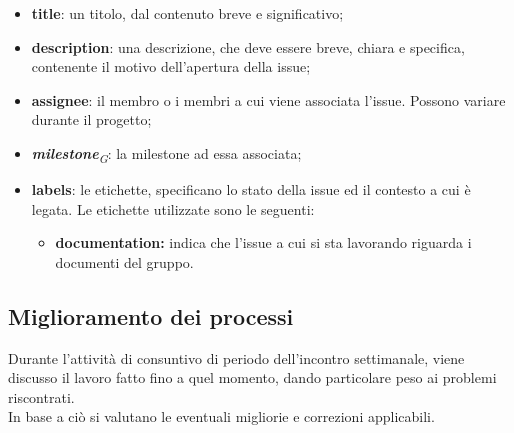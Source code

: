 \documentclass[a4paper, 12pt]{article}
\begin{document}
\begin{itemize}
    \item \textbf{title}: un titolo, dal contenuto breve e significativo;
    \item \textbf{description}: una descrizione, che deve essere breve, chiara e specifica, contenente il
    motivo dell'apertura della issue;
    \item \textbf{assignee}: il membro o i membri a cui viene associata l'issue.
    Possono variare durante il progetto;
    \item \textbf{\textit{milestone}}\textit{\textsubscript{G}}: la milestone ad
    essa associata;
    \item \textbf{labels}: le etichette, specificano lo stato della issue ed il
    contesto a cui è legata. Le etichette utilizzate sono le seguenti:
    \begin{itemize}
        \item \textbf{documentation:} indica che l'issue a cui si sta lavorando
        riguarda i documenti del gruppo.
    \end{itemize}
\end{itemize}


\subsection{Miglioramento dei processi}
Durante l'attività di consuntivo di periodo dell’incontro settimanale, viene discusso il lavoro
fatto fino a quel momento, dando particolare peso ai problemi riscontrati. \\In base a ciò si valutano
le eventuali migliorie e correzioni applicabili.
\end{document}

